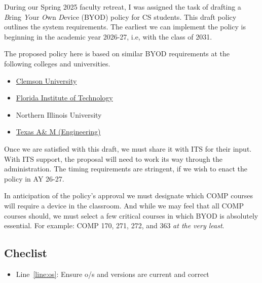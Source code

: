 \noindent 
During our Spring 2025 faculty retreat, I was assigned the task of drafting a \emph{B}ring \emph{Y}our \emph{O}wn \emph{D}evice (BYOD) policy for CS students. This draft policy outlines the system requirements. The earliest we can implement the policy is beginning in the academic year 2026-27, i.e, with the class of 2031.

The proposed policy here is based on similar BYOD requirements at the following colleges and universities.

\begin{itemize}
    \item \href{https://clemsonpub.cfmnetwork.com/B.aspx?BookId=11654&PageId=458060}{Clemson University}
    
    \item \href{https://www.fit.edu/policies/information-technology/policies/it-1015-bring-your-own-device-byod-policy/}{Florida Institute of Technology}
    
    \item Northern Illinois University

    \item \href{https://engineering.tamu.edu/academics/byod/index.html}{Texas A\& M (Engineering)}
\end{itemize}

Once we are satisfied with this draft, we must share it with ITS for their input. With ITS support, the proposal will need to work its way through the administration. {\color{purple}The timing requirements are stringent,} if we wish to enact the policy in AY 26-27.

In anticipation of the policy's approval we must designate which COMP courses will require a device in the classroom. And while we may feel that all COMP courses should, we must select a few critical courses in which BYOD is absolutely essential. For example: COMP 170, 271, 272, and 363 \emph{at the very least}.

\subsection*{Checlist}
\begin{itemize}
    \item Line~\ref{line:os}: Ensure o/s and versions are current and correct
\end{itemize}


\newpage